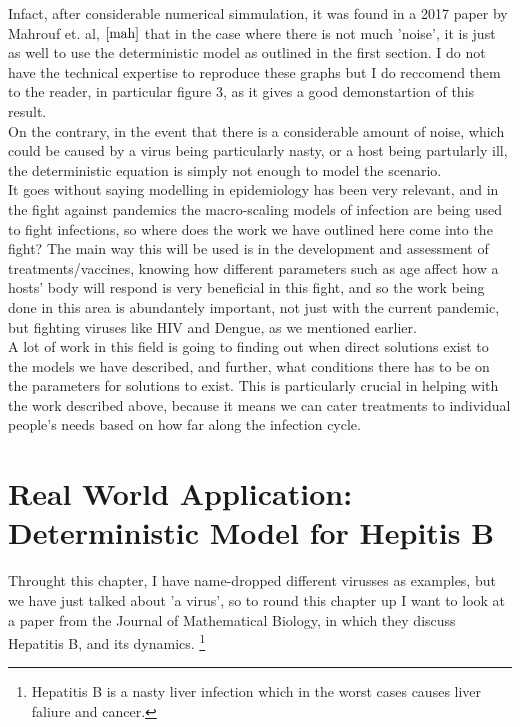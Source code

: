 Infact, after considerable numerical simmulation, it was found in a 2017 paper by Mahrouf et. al, $\cite{mah}$ that in the case where there is not much 'noise', it is just as well to use the deterministic model as outlined in the first section. I do not have the technical expertise to reproduce these graphs but I do reccomend them to the reader, in particular figure 3, as it gives a good demonstartion of this result. \\

On the contrary, in the event that there is a considerable amount of noise, which could be caused by a virus being particularly nasty, or a host being partularly ill, the deterministic equation is simply not enough to model the scenario. \\

It goes without saying modelling in epidemiology has been very relevant, and in the fight against pandemics the macro-scaling models of infection are being used to fight infections, so where does the work we have outlined here come into the fight? The main way this will be used is in the development and assessment of treatments/vaccines, knowing how different parameters such as age affect how a hosts' body will respond is very beneficial in this fight, and so the work being done in this area is abundantely important, not just with the current pandemic, but fighting viruses like HIV and Dengue, as we mentioned earlier. \\

A lot of work in this field is going to finding out when direct solutions exist to the models we have described, and further, what conditions there has to be on the parameters for solutions to exist. This is particularly crucial in helping with the work described above, because it means we can cater treatments to individual people's needs based on how far along the infection cycle. \\

\section{Real World Application: Deterministic Model for Hepitis B}
Throught this chapter, I have name-dropped different virusses as examples, but we have just talked about 'a virus', so to round this chapter up I want to look at a paper from the Journal of Mathematical Biology, in which they discuss Hepatitis B, and its dynamics. \footnote{Hepatitis B is a nasty liver infection which in the worst cases causes liver faliure and cancer.} 

